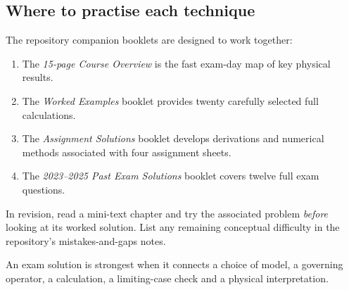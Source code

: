 \subsection{Where to practise each technique}
The repository companion booklets are designed
to work together:
\begin{enumerate}
\item The \emph{15-page Course Overview} is the
fast exam-day map of key physical results.
\item The \emph{Worked Examples} booklet provides
twenty carefully selected full calculations.
\item The \emph{Assignment Solutions} booklet
develops derivations and numerical methods
associated with four assignment sheets.
\item The \emph{2023--2025 Past Exam Solutions}
booklet covers twelve full exam questions.
\end{enumerate}
In revision, read a mini-text chapter
and try the associated problem \emph{before}
looking at its worked solution.
List any remaining conceptual difficulty
in the repository's mistakes-and-gaps notes.
\begin{checkpoint}
An exam solution is strongest when it
connects a choice of model, a governing
operator, a calculation, a limiting-case
check and a physical interpretation.
\end{checkpoint}
